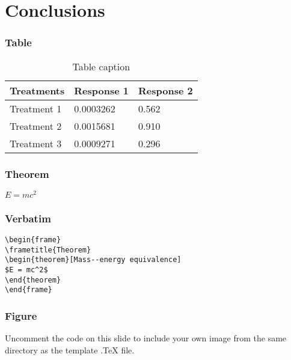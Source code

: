 \documentclass{beamer}
\begin{document}
\section{Conclusions}

\begin{frame}
\frametitle{Table}
\begin{table}
\begin{tabular}{l l l}
\toprule
\textbf{Treatments} & \textbf{Response 1} & \textbf{Response 2}\\
\midrule
Treatment 1 & 0.0003262 & 0.562 \\
Treatment 2 & 0.0015681 & 0.910 \\
Treatment 3 & 0.0009271 & 0.296 \\
\bottomrule
\end{tabular}
\caption{Table caption}
\end{table}
\end{frame}


\begin{frame}
\frametitle{Theorem}
\begin{theorem}
$E = mc^2$
\end{theorem}
\end{frame}


\begin{frame}[fragile] %
\frametitle{Verbatim}
\begin{example}
\begin{verbatim}
\begin{frame}
\frametitle{Theorem}
\begin{theorem}[Mass--energy equivalence]
$E = mc^2$
\end{theorem}
\end{frame}\end{verbatim}
\end{example}
\end{frame}


\begin{frame}
\frametitle{Figure}
Uncomment the code on this slide to include your own image from the same directory as the template .TeX file.
\end{frame}
\end{document}

